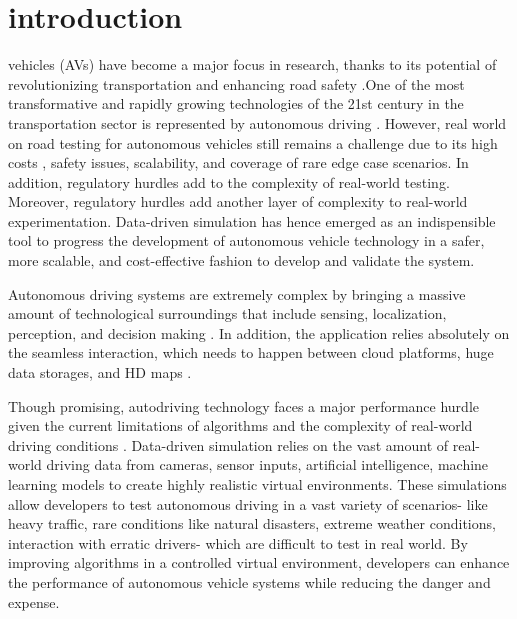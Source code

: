 \documentclass[lettersize,journal]{IEEEtran}
\begin{document}
\section{introduction}
 vehicles (AVs) have become a major focus in research, thanks to its potential of revolutionizing transportation and enhancing road safety \cite{janai2020computer}.One of the most transformative and rapidly growing technologies of the 21st century in the transportation sector is represented by autonomous driving \cite{mirzai2023future}. However, real world on road testing for autonomous vehicles still remains a challenge due to its high costs \cite{NEURIPS2023_1838feeb} , safety issues, scalability, and coverage of rare edge case scenarios. In addition, regulatory hurdles add to the complexity of real-world testing. Moreover, regulatory hurdles add another layer of complexity to real-world experimentation. Data-driven simulation has hence emerged as an indispensible tool to progress the development of autonomous vehicle technology in a safer, more scalable, and cost-effective fashion to develop and validate the system.

Autonomous driving systems are extremely complex by bringing a massive amount of technological surroundings that include sensing, localization, perception, and decision making \cite{liu2017computer}. In addition, the application relies absolutely on the seamless interaction, which needs to happen between cloud platforms, huge data storages, and HD maps \cite{liu2017computer}.

Though promising, autodriving technology faces a major performance hurdle given the current limitations of algorithms and the complexity of real-world driving conditions  \cite{li2023datacentric}. Data-driven simulation relies on the vast amount of real-world driving data from cameras, sensor inputs, artificial intelligence, machine learning models to create highly realistic virtual environments. These simulations allow developers to test autonomous driving in a vast variety of scenarios- like heavy traffic, rare conditions like natural disasters, extreme weather conditions, interaction with erratic drivers- which are difficult to test in real world. By improving algorithms in a controlled virtual environment, developers can enhance the performance of autonomous vehicle systems while reducing the danger and expense.
\end{document}
